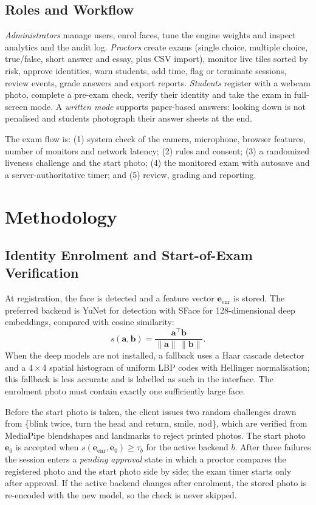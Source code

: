 \documentclass[conference]{IEEEtran}
\begin{document}
\subsection{Roles and Workflow}
\emph{Administrators} manage users, enrol faces, tune the engine weights and inspect analytics and the audit log. \emph{Proctors} create exams (single choice, multiple choice, true/false, short answer and essay, plus CSV import), monitor live tiles sorted by risk, approve identities, warn students, add time, flag or terminate sessions, review events, grade answers and export reports. \emph{Students} register with a webcam photo, complete a pre-exam check, verify their identity and take the exam in full-screen mode. A \emph{written mode} supports paper-based answers: looking down is not penalised and students photograph their answer sheets at the end.

The exam flow is: (1) system check of the camera, microphone, browser features, number of monitors and network latency; (2) rules and consent; (3) a randomized liveness challenge and the start photo; (4) the monitored exam with autosave and a server-authoritative timer; and (5) review, grading and reporting.

\section{Methodology}
\subsection{Identity Enrolment and Start-of-Exam Verification}
At registration, the face is detected and a feature vector $\mathbf{e}_{\text{enr}}$ is stored. The preferred backend is YuNet \cite{wu2023yunet} for detection with SFace \cite{zhong2021sface} for 128-dimensional deep embeddings, compared with cosine similarity:
\begin{equation}
s(\mathbf{a},\mathbf{b}) = \frac{\mathbf{a}^\top\mathbf{b}}{\lVert\mathbf{a}\rVert\,\lVert\mathbf{b}\rVert}.
\end{equation}
When the deep models are not installed, a fallback uses a Haar cascade detector \cite{viola2001rapid} and a $4{\times}4$ spatial histogram of uniform LBP codes \cite{ahonen2006lbp} with Hellinger normalisation; this fallback is less accurate and is labelled as such in the interface. The enrolment photo must contain exactly one sufficiently large face.

Before the start photo is taken, the client issues two random challenges drawn from \{blink twice, turn the head and return, smile, nod\}, which are verified from MediaPipe blendshapes and landmarks to reject printed photos. The start photo $\mathbf{e}_0$ is accepted when $s(\mathbf{e}_{\text{enr}},\mathbf{e}_0)\ge\tau_b$ for the active backend $b$. After three failures the session enters a \emph{pending approval} state in which a proctor compares the registered photo and the start photo side by side; the exam timer starts only after approval. If the active backend changes after enrolment, the stored photo is re-encoded with the new model, so the check is never skipped.
\end{document}

